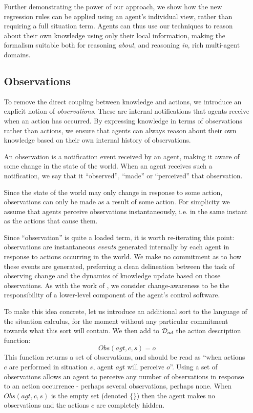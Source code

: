 Further demonstrating the power of our approach, we show how the new
regression rules can be applied using an agent's individual view,
rather than requiring a full situation term. Agents can thus use our
techniques to reason about their own knowledge using only their local
information, making the formalism suitable both for reasoning \emph{about},
and reasoning \emph{in},\emph{ }rich multi-agent domains.


\subsection{Observations}

To remove the direct coupling between knowledge and actions, we introduce
an explicit notion of \emph{observations}. These are internal notifications
that agents receive when an action has occurred. By expressing knowledge
in terms of observations rather than actions, we ensure that agents
can always reason about their own knowledge based on their own internal
history of observations.

\begin{defnL}
[{Observations}] An observation is a notification event received
by an agent, making it aware of some change in the state of the world.
When an agent receives such a notification, we say that it {}``observed'',
{}``made'' or {}``perceived'' that observation.
\end{defnL}
Since the state of the world may only change in response to some action,
observations can only be made as a result of some action. For simplicity
we assume that agents perceive observations instantaneously, i.e.
in the same instant as the actions that cause them.

Since {}``observation'' is quite a loaded term, it is worth re-iterating
this point: observations are instantaneous\emph{ events} generated
internally by each agent in response to actions occurring in the world.
We make no commitment as to how these events are generated, preferring
a clean delineation between the task of observing change and the dynamics
of knowledge update based on those observations. As with the work
of \citep{scherl03sc_knowledge}, we consider change-awareness to
be the responsibility of a lower-level component of the agent's control
software.

To make this idea concrete, let us introduce an additional sort 
to the language of the situation calculus, for the moment without
any particular commitment towards what this sort will contain. We
then add to $\mathcal{D}_{ad}$ the action description function:\[
Obs(agt,c,s)=o\]
This function returns a set of observations, and should be read as
{}``when actions $c$ are performed in situation $s$, agent $agt$
will perceive $o$''. Using a set of observations allows an agent
to perceive any number of observations in response to an action occurrence
- perhaps several observations, perhaps none. When $Obs(agt,c,s)$
is the empty set (denoted $\{\}$) then the agent makes no observations
and the actions $c$ are completely hidden. 

